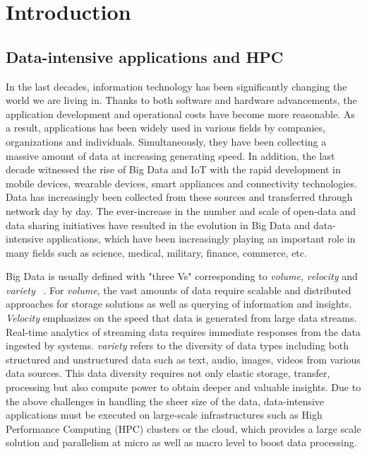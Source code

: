 \chapter{Introduction}
\label{introduction}

\section{Data-intensive applications and HPC}

In the last decades, information technology has been significantly changing the 
world we are living in. 
Thanks to both software and hardware advancements, the application development 
and operational costs have become more reasonable. 
As a result, applications has been widely used in various fields by companies, 
organizations and individuals. Simultaneously, they have been collecting a massive 
amount of data at increasing generating speed.
In addition, the last decade witnessed the rise of Big Data and IoT with the rapid 
development in mobile devices, wearable devices, smart appliances and connectivity  
technologies. Data has increasingly been collected from these sources and transferred 
through network day by day. 
The ever-increase in the number and scale of open-data and data sharing initiatives 
have resulted in the evolution in Big Data and data-intensive applications, 
which have been increasingly playing an important role in many fields such as 
science, medical, military, finance, commerce, etc.

Big Data is usually defined with "three Vs" corresponding to \textit{volume}, 
\textit{velocity} and \textit{variety} ~\cite{de2016formal}.  
For \textit{volume}, the vast amounts of data require scalable and distributed 
approaches for storage solutions as well as querying of information and insights.  
\textit{Velocity} emphasizes on the speed that data is generated from large data 
streams. Real-time analytics of streaming data requires immediate responses 
from the data ingested by systems.
\textit{variety} refers to the diversity of data types including both structured and 
unstructured data such as text, audio, images, videos from various data sources.
This data diversity requires not only elastic storage, transfer, processing but also 
compute power to obtain deeper and valuable insights.  
Due to the above challenges in handling the sheer size of the data, data-intensive 
applications must be executed on large-scale infrastructures such as High Performance 
Computing (HPC) clusters or the cloud, which provides a large scale solution 
and parallelism at micro as well as macro level to boost data processing.

